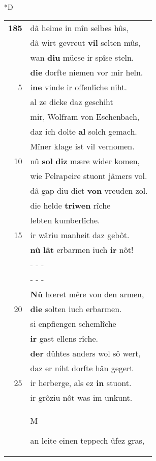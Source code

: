 \documentclass[8pt,a4paper,notitlepage]{article}
\begin{document}
\begin{table}[ht]
\begin{minipage}[t]{0.5\linewidth}
\small
\begin{center}*D
\end{center}
\begin{tabular}{rl}
\textbf{185} & dâ heime in mîn selbes hûs,\\ 
 & dâ wirt gevreut \textbf{vil} selten mûs,\\ 
 & wan \textbf{diu} müese ir spîse steln.\\ 
 & \textbf{die} dorfte niemen vor mir heln.\\ 
5 & i\textbf{ne} vinde ir offenlîche niht.\\ 
 & al ze dicke daz geschiht\\ 
 & mir, Wolfram von Eschenbach,\\ 
 & daz ich dolte \textbf{al} solch gemach.\\ 
 & Mîner klage ist vil vernomen.\\ 
10 & nû \textbf{sol} \textbf{diz} mære wider komen,\\ 
 & wie Pelrapeire stuont jâmers vol.\\ 
 & dâ gap diu diet \textbf{von} vreuden zol.\\ 
 & die helde \textbf{triwen} rîche\\ 
 & lebten kumberlîche.\\ 
15 & ir wâriu manheit daz gebôt.\\ 
 & \textbf{nû} \textbf{lât} erbarmen iuch \textbf{ir} nôt!\\ 
 & \multicolumn{1}{l}{ - - - }\\ 
 & \multicolumn{1}{l}{ - - - }\\ 
 & \textbf{Nû} hœret mêre von den armen,\\ 
20 & \textbf{die} solten iuch erbarmen.\\ 
 & si enpfiengen schemlîche\\ 
 & \textbf{ir} gast ellens rîche.\\ 
 & \textbf{der} dûhtes anders wol sô wert,\\ 
 & daz er niht dorfte hân gegert\\ 
25 & ir herberge, als ez \textbf{in} stuont.\\ 
 & ir grôziu nôt was im unkunt.\\ 
 & \begin{large}M\end{large}an leite einen teppech ûfez gras,\\ 

\end{tabular}
\end{minipage}
\end{table}
\end{document}
